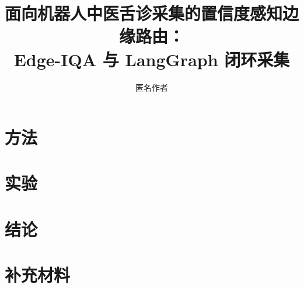 \documentclass[11pt,twocolumn]{article}
\title{面向机器人中医舌诊采集的置信度感知边缘路由：\\
Edge-IQA 与 LangGraph 闭环采集}
\author{匿名作者}
\date{}
\numberwithin{equation}{section}
\begin{document}
\maketitle





\section{方法}
\label{sec:method-zh}






\section{实验}
\label{sec:experiments-zh}














\section{结论}





\appendix
\section{补充材料}
\label{sec:supp-zh}


\end{document}
